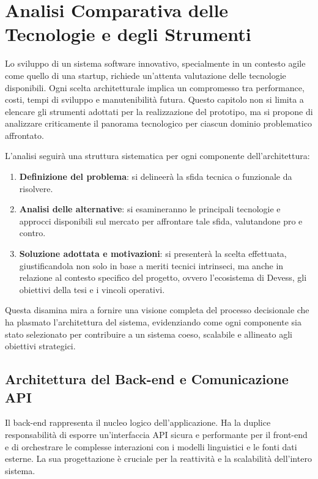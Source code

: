 \chapter{Analisi Comparativa delle Tecnologie e degli Strumenti}
\label{ch:tecnologie_strumenti}

Lo sviluppo di un sistema software innovativo, specialmente in un contesto agile come quello di una startup, richiede un'attenta valutazione delle tecnologie disponibili. Ogni scelta architetturale implica un compromesso tra performance, costi, tempi di sviluppo e manutenibilità futura. Questo capitolo non si limita a elencare gli strumenti adottati per la realizzazione del prototipo, ma si propone di analizzare criticamente il panorama tecnologico per ciascun dominio problematico affrontato.

L'analisi seguirà una struttura sistematica per ogni componente dell'architettura:
\begin{enumerate}
    \item \textbf{Definizione del problema}: si delineerà la sfida tecnica o funzionale da risolvere.
    \item \textbf{Analisi delle alternative}: si esamineranno le principali tecnologie e approcci disponibili sul mercato per affrontare tale sfida, valutandone pro e contro.
    \item \textbf{Soluzione adottata e motivazioni}: si presenterà la scelta effettuata, giustificandola non solo in base a meriti tecnici intrinseci, ma anche in relazione al contesto specifico del progetto, ovvero l'ecosistema di Devess, gli obiettivi della tesi e i vincoli operativi.
\end{enumerate}

Questa disamina mira a fornire una visione completa del processo decisionale che ha plasmato l'architettura del sistema, evidenziando come ogni componente sia stato selezionato per contribuire a un sistema coeso, scalabile e allineato agli obiettivi strategici.

\section{Architettura del Back-end e Comunicazione API}
\label{sec:backend_analysis}

Il back-end rappresenta il nucleo logico dell'applicazione. Ha la duplice responsabilità di esporre un'interfaccia API sicura e performante per il front-end e di orchestrare le complesse interazioni con i modelli linguistici e le fonti dati esterne. La sua progettazione è cruciale per la reattività e la scalabilità dell'intero sistema.

